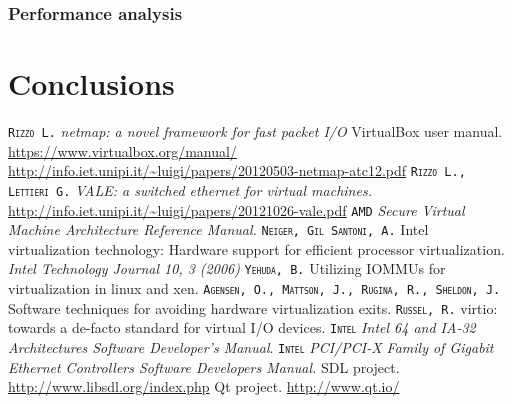 \documentclass[a4paper, 12pt, titlepage]{report}
\newcommand{\autori}[1]{\textsc{\texttt{#1}}}
\begin{document}
\subsection{Performance analysis}
\chapter{Conclusions}

\begin{thebibliography}{30}
 \autori{Rizzo L.} \textit{netmap: a novel framework for fast packet I/O}
 VirtualBox user manual. \url{https://www.virtualbox.org/manual/}
 \url{http://info.iet.unipi.it/~luigi/papers/20120503-netmap-atc12.pdf}
 \autori{Rizzo L., Lettieri G.} \textit{VALE: a switched ethernet for virtual machines.} \url{http://info.iet.unipi.it/~luigi/papers/20121026-vale.pdf}
 \autori{AMD} \textit{Secure Virtual Machine Architecture Reference Manual.}
 \autori{Neiger, Gil Santoni, A.} Intel virtualization technology: Hardware support for efficient processor virtualization. \textit{Intel Technology Journal 10, 3 (2006)}
 \autori{Yehuda, B.} Utilizing IOMMUs for virtualization in linux and xen.
 \autori{Agensen, O., Mattson, J., Rugina, R., Sheldon, J.} Software techniques for avoiding hardware virtualization exits.
 \autori{Russel, R.} virtio: towards a de-facto standard for virtual I/O devices.
 \autori{Intel} \textit{Intel 64 and IA-32 Architectures Software Developer's Manual}.
 \autori{Intel} \textit{PCI/PCI-X Family of Gigabit Ethernet Controllers Software Developers Manual.}
 SDL project. \url{http://www.libsdl.org/index.php}
 Qt project. \url{http://www.qt.io/}
\end{thebibliography}
	
\end{document}
